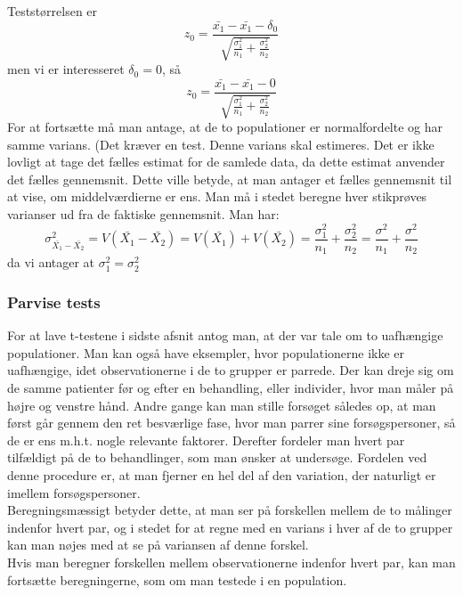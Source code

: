 \documentclass[11pt]{article}
\begin{document}
Teststørrelsen er
$$z_0=\frac{\bar{x_1}-\bar{x_1}-\delta_0}{\sqrt{\frac{\sigma_1^2}{n_1}+\frac{\sigma_2^2}{n_2}}}$$
men vi er interesseret $\delta_0=0$, så
$$z_0=\frac{\bar{x_1}-\bar{x_1}-0}{\sqrt{\frac{\sigma_1^2}{n_1}+\frac{\sigma_2^2}{n_2}}}$$
For at fortsætte må man antage, at de to populationer er normalfordelte og har samme varians. (Det kræver en test. Denne varians skal estimeres. Det er ikke lovligt at tage det fælles estimat for de samlede data, da dette estimat anvender det fælles gennemsnit. Dette ville betyde, at man antager et fælles gennemsnit til at vise, om middelværdierne er ens. Man må i stedet beregne hver stikprøves varianser ud fra de faktiske gennemsnit. Man har:
$$\sigma^2_{\bar{X_1}-\bar{X_2}}=V(\bar{X_1}-\bar{X_2})=V(\bar{X_1})+V(\bar{X_2})=\frac{\sigma_1^2}{n_1}+\frac{\sigma_2^2}{n_2}=\frac{\sigma^2}{n_1}+\frac{\sigma^2}{n_2}$$
da vi antager at $\sigma^2_1=\sigma^2_2$

\subsubsection{Parvise tests}
For at lave t-testene i sidste afsnit antog man, at der var tale om to uafhængige populationer. Man kan også have eksempler, hvor populationerne ikke er uafhængige, idet observationerne i de to grupper er parrede. Der kan dreje sig om de samme patienter før og efter en behandling, eller individer, hvor man måler på højre og venstre hånd. Andre gange kan man stille forsøget således op, at man først går gennem den ret besværlige fase, hvor man parrer sine forsøgspersoner, så de er ens m.h.t. nogle relevante faktorer. Derefter fordeler man hvert par tilfældigt på de to behandlinger, som man ønsker at undersøge. Fordelen ved denne procedure er, at man fjerner en hel del af den variation, der naturligt er imellem forsøgspersoner.\\[0.2cm]
Beregningsmæssigt betyder dette, at man ser på forskellen mellem de to målinger indenfor hvert par, og i stedet for at regne med en varians i hver af de to grupper kan man nøjes med at se på variansen af denne forskel.\\[0.2cm]
Hvis man beregner forskellen mellem observationerne indenfor hvert par, kan man fortsætte beregningerne, som om man testede i en population.
\end{document}
